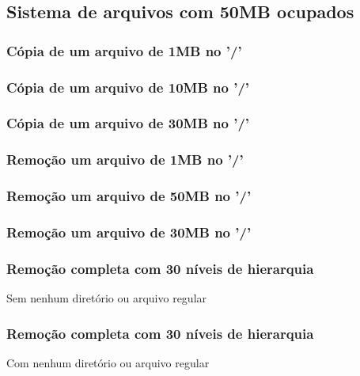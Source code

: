 \documentclass{beamer}
\begin{document}
\subsection{Sistema de arquivos com 50MB ocupados}
\begin{frame}
\frametitle{Cópia de um arquivo de 1MB no '/'} 

\justifying
\end{frame}


\begin{frame}
\frametitle{Cópia de um arquivo de 10MB no '/'} 

\justifying
\end{frame}


\begin{frame}
\frametitle{Cópia de um arquivo de 30MB no '/'} 

\justifying
\end{frame}


\begin{frame}
\frametitle{Remoção um arquivo de 1MB no '/'} 

\justifying
\end{frame}




\begin{frame}
\frametitle{Remoção um arquivo de 50MB no '/'} 

\justifying
\end{frame}


\begin{frame}
\frametitle{Remoção um arquivo de 30MB no '/'} 

\justifying
\end{frame}

\begin{frame}
\frametitle{Remoção completa com 30 níveis de hierarquia} 
Sem nenhum diretório ou arquivo regular
\justifying
\end{frame}


\begin{frame}
\frametitle{Remoção completa com 30 níveis de hierarquia} 
Com nenhum diretório ou arquivo regular
\justifying
\end{frame}
\end{document}
